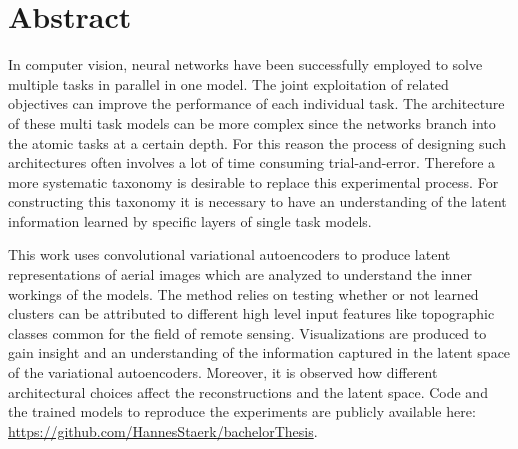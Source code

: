 \section{Abstract}

In computer vision, neural networks have been successfully employed to solve multiple tasks in 
parallel in one model. The joint exploitation of related objectives can improve the performance
of each individual task. 
The architecture of these multi task models can be more complex since the networks branch into the atomic
tasks at a certain depth. For this reason the process of designing such architectures
often involves a lot of time consuming 
trial-and-error. Therefore a more systematic taxonomy is desirable to replace this experimental process.
For constructing this taxonomy it is necessary to have an understanding of the latent information 
learned by specific layers of single task models.

This work uses convolutional variational autoencoders to produce latent representations of 
aerial images which are analyzed to understand the inner workings of the models.
The method relies on testing whether or not learned clusters can be attributed to
different high level input features like topographic classes common for the field
of remote sensing. Visualizations are produced to gain insight and an understanding of the
information captured in the latent space of the variational autoencoders.
Moreover, it is observed how different architectural choices affect the reconstructions and the
latent space.
Code and the trained models to reproduce the experiments are publicly available here:
\href{https://github.com/HannesStaerk/bachelorThesis}{https://github.com/HannesStaerk/bachelorThesis}.



